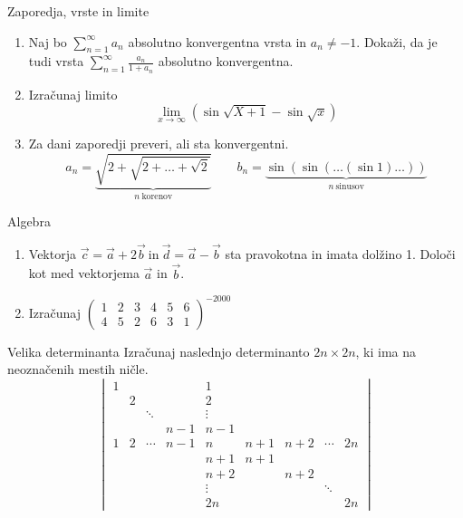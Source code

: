 \begin{frame}{Zaporedja, vrste in limite}
	\begin{enumerate}
		\item 
		Naj bo $\sum_{n=1}^\infty a_n$ absolutno konvergentna vrsta in $a_n \ne -1$.
		Dokaži, da je tudi vrsta $\sum_{n=1}^\infty \frac{a_n}{1+a_n}$
		absolutno konvergentna.

		\item
		Izračunaj limito
		\begin{equation*}
			\lim_{x\to\infty}(\sin\sqrt{X+1}-\sin\sqrt{x})
		\end{equation*}

		\item
		Za dani zaporedji preveri, ali sta konvergentni.
		\begin{equation*}
		a_n = \underbrace{\sqrt{2+\sqrt{2+\dots+\sqrt{2}}}}_{n~\text{korenov}}  \qquad
		b_n = \underbrace{\sin(\sin(\dots(\sin 1)\dots))}_{n~\text{sinusov}}
		\end{equation*}
	\end{enumerate}
\end{frame}

\begin{frame}{Algebra}
	\begin{enumerate}
		\item
		Vektorja $\vec{c} = \vec{a} + 2\vec{b}~\text{in}~\vec{d} = \vec{a} - \vec{b}$
		sta pravokotna in imata dolžino 1. Določi kot med vektorjema $\vec{a}$ in $\vec{b}$.
		\item 
		Izračunaj
		$\begin{pmatrix}
			1 & 2 & 3 & 4 & 5 & 6 \\
			4 & 5 & 2 & 6 & 3 & 1
		\end{pmatrix}^{-2000}$
	\end{enumerate}
\end{frame}

\begin{frame}{Velika determinanta}
	Izračunaj naslednjo determinanto $2n \times 2n$, ki ima na neoznačenih mestih ničle.
	\begin{equation*}
		\begin{vmatrix}
			1 &&&& 1 \\
			& 2 &&& 2 \\
			&& \ddots && \vdots \\
			&&& n-1 & n-1 \\
			1 & 2 & \cdots & n-1 & n & n+1 & n+2 & \cdots & 2n \\
			&&&& n + 1 & n+1 \\
			&&&& n+2 && n+2 \\
			&&&& \vdots &&& \ddots \\
			&&&& 2n &&&& 2n
		\end{vmatrix}
	\end{equation*}
\end{frame}

